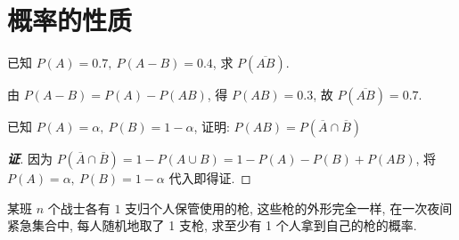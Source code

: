 \section{概率的性质}

\begin{example}
    已知 $P(A)=0.7,~P(A-B)=0.4$, 求 $P(\overline{AB})$.
\end{example}
\begin{solution}
    由 $P(A-B)=P(A)-P(AB)$, 得 $P(AB)=0.3$, 故 $P(\overline{AB})=0.7.$
\end{solution}

\begin{example}
    已知 $P(A)=\alpha,~P(B)=1-\alpha$, 证明: $P(AB)=P(\overline{A}\cap\overline{B})$
\end{example}
\begin{proof}[{\songti \textbf{证}}]
    因为 $P(\overline{A}\cap\overline{B})=1-P(A\cup B)=1-P(A)-P(B)+P(AB)$, 将 $P(A)=\alpha,~P(B)=1-\alpha$ 代入即得证.
\end{proof}

\begin{example}
    某班 $n$ 个战士各有 $1$ 支归个人保管使用的枪, 这些枪的外形完全一样, 在一次夜间紧急集合中, 每人随机地取了 1 支枪, 求至少有 1 个人拿到自己的枪的概率.
\end{example}
\begin{solution}
    
\end{solution}